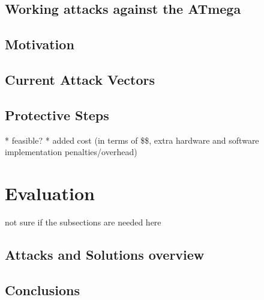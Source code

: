 \documentclass[12pt,a4paper,twocolumn]{article}
\begin{document}
	\subsection{Working attacks against the ATmega}
	\subsection{Motivation}
	\subsection{Current Attack Vectors}
	\subsection{Protective Steps}
		* feasible? 
		* added cost (in terms of \$\$, extra hardware and software implementation penalties/overhead)
	
	\section{Evaluation}
	not sure if the subsections are needed here
	\subsection{Attacks and Solutions overview}
	\subsection{Conclusions}
	
	\pagebreak
	\onecolumn
	
		
	
\end{document}

